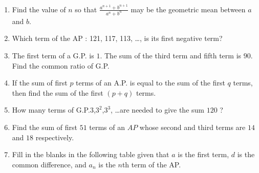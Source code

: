 \begin{enumerate}[label=\thesection.\arabic*,ref=\thesection.\theenumi]
\item Find the value of $n$ so that $\frac{a^{n+1} + b^{n+1}}{a^{n}+b^{n}}$ may be the geometric mean between $a$ and $b$. \\
\solution

\pagebreak

\item Which term of the AP : 121, 117, 113, \ldots, is its first negative term?\\
\solution

\pagebreak

\item The first term of a G.P. is $1$. The sum of the third term and fifth term is $90$. Find the common ratio of G.P.\\
\solution

\pagebreak

\item If the sum of first $p$ terms of an A.P. is equal to the sum of the first $q$ terms, then find the sum of the first $(p + q)$ terms.\\
\solution

\pagebreak
\item How many terms of G.P.$3$,$3^2$,$3^3$, \ldots are needed to give the sum $120$ ?\\
\solution

\pagebreak

\item Find the sum of first $51$ terms of an $AP$ whose second and third terms are $14$ and $18$ respectively. \\
\solution

\pagebreak

\item Fill in the blanks in the following table given that $a$ is the first term, $d$ is the common difference, and $a_n$ is the $n$th term of the AP.\\
\begin{table}[h!]
  \centering
  
   \label{tab:ESTable1}
\end{table}
\solution

\pagebreak


\end{enumerate}
